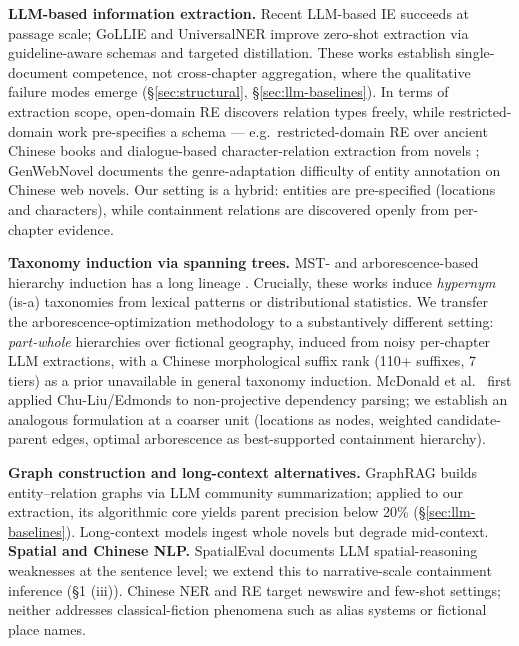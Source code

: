 \documentclass[11pt]{article}
\begin{document}
\textbf{LLM-based information extraction.} Recent LLM-based IE \cite{wei2024zeroshot,wadhwa2023revisiting} succeeds at passage scale; GoLLIE \cite{sainz2024gollie} and UniversalNER \cite{zhou2024universalner} improve zero-shot extraction via guideline-aware schemas and targeted distillation. These works establish single-document competence, not cross-chapter aggregation, where the qualitative failure modes emerge (\S\ref{sec:structural}, \S\ref{sec:llm-baselines}). In terms of extraction scope, open-domain RE discovers relation types freely, while restricted-domain work pre-specifies a schema --- e.g.\ restricted-domain RE over ancient Chinese books \cite{liu2025guji} and dialogue-based character-relation extraction from novels \cite{yan2025novelre}; GenWebNovel \cite{zhao2025genwebnovel} documents the genre-adaptation difficulty of entity annotation on Chinese web novels. Our setting is a hybrid: entities are pre-specified (locations and characters), while containment relations are discovered openly from per-chapter evidence.

\textbf{Taxonomy induction via spanning trees.} MST- and arborescence-based hierarchy induction has a long lineage \cite{kozareva2010taxonomy,velardi2013ontolearn,bansal2014taxonomy}. Crucially, these works induce \textit{hypernym} (is-a) taxonomies from lexical patterns \cite{hearst1992hyponyms} or distributional statistics. We transfer the arborescence-optimization methodology to a substantively different setting: \textit{part-whole} hierarchies over fictional geography, induced from noisy per-chapter LLM extractions, with a Chinese morphological suffix rank (110+ suffixes, 7 tiers) as a prior unavailable in general taxonomy induction. McDonald et al.\ \cite{mcdonald2005} first applied Chu-Liu/Edmonds to non-projective dependency parsing; we establish an analogous formulation at a coarser unit (locations as nodes, weighted candidate-parent edges, optimal arborescence as best-supported containment hierarchy).

\textbf{Graph construction and long-context alternatives.} GraphRAG \cite{edge2024graphrag} builds entity--relation graphs via LLM community summarization; applied to our extraction, its algorithmic core yields parent precision below 20\% (\S\ref{sec:llm-baselines}). Long-context models \cite{liu2023lost} ingest whole novels but degrade mid-context.
\textbf{Spatial and Chinese NLP.} SpatialEval \cite{yamada2024spatial} documents LLM spatial-reasoning weaknesses at the sentence level; we extend this to narrative-scale containment inference (\S1 (iii)). Chinese NER \cite{zhang2018chinesener} and RE \cite{lin2019fewrel} target newswire and few-shot settings; neither addresses classical-fiction phenomena such as alias systems or fictional place names.
\end{document}
